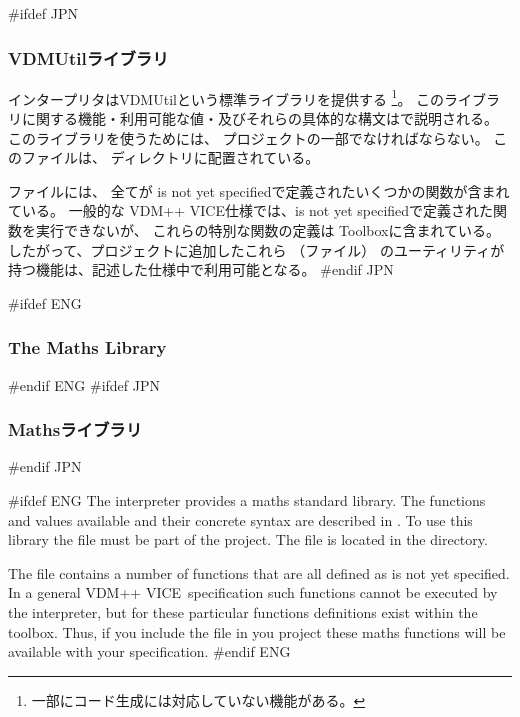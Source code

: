 \documentclass[\pformat,12pt]{article}
\newcommand{\vdmslpp}{VDM-SL}
\newcommand{\Toolbox}{Toolbox}
\newcommand{\vdmslpp}{VDM++}
\newcommand{\Toolbox}{Toolbox}
\renewcommand{\vdmslpp}{VDM++ VICE}
\newcommand{\keyw}[1]{{\sf #1}}
\begin{document}
#ifdef JPN
\subsubsection*{VDMUtilライブラリ}
インタープリタはVDMUtilという標準ライブラリを提供する
\footnote{一部にコード生成には対応していない機能がある。}。
このライブラリに関する機能・利用可能な値・及びそれらの具体的な構文は\cite{LangMan-SCSK}で説明される。
このライブラリを使うためには、
プロジェクトの一部でなければならない。
このファイルは、
ディレクトリに配置されている。

ファイルには、
全てが \keyw{is not yet specified}で定義されたいくつかの関数が含まれている。
一般的な \vdmslpp 仕様では、\keyw{is not yet specified}で定義された関数を実行できないが、
これらの特別な関数の定義は \Toolbox に含まれている。
したがって、プロジェクトに追加したこれら
（ファイル）
のユーティリティが持つ機能は、記述した仕様中で利用可能となる。
#endif JPN

#ifdef ENG
\subsubsection*{The Maths Library}
#endif ENG
#ifdef JPN
\subsubsection*{Mathsライブラリ}
#endif JPN

#ifdef ENG
The interpreter provides a maths standard library. The functions and
values available and their concrete syntax are described in
\cite{LangMan-SCSK}. To use this library the file
 must be part of the
project. The file is located
in the  directory.

The  file contains a number of
functions that are all defined as \keyw{is not yet specified}. In a
general \vdmslpp\ specification such functions cannot be executed by
the interpreter, but for these particular functions definitions
exist within the toolbox.  Thus, if you include the
 file in you project these maths
functions will be available with your specification.
#endif ENG
\end{document}
